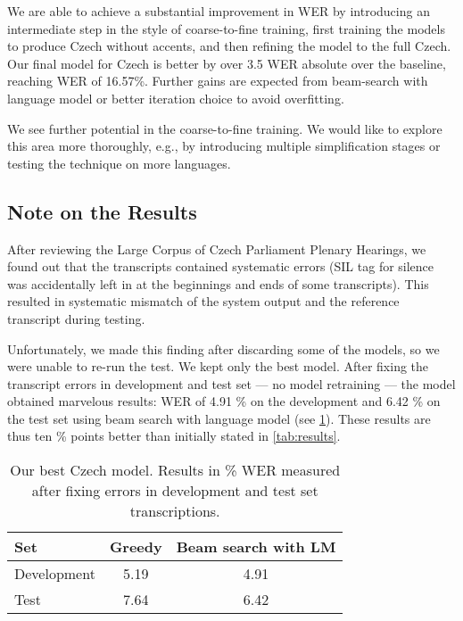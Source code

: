 We are able to achieve a substantial improvement in WER by introducing an intermediate step in the style of coarse-to-fine training, first training the models to produce Czech without accents, and then refining the model to the full Czech.
Our final model for Czech is better by over 3.5 WER absolute over the baseline, reaching WER of 16.57\%. Further gains are expected from beam-search with language model or better iteration choice to avoid overfitting.


We see further potential in the coarse-to-fine training. We would like to explore this area more thoroughly, e.g., by introducing multiple simplification stages or testing the technique on more languages.


\subsection{Note on the Results}
After reviewing the Large Corpus of Czech Parliament Plenary Hearings, we found out that the transcripts contained systematic errors (SIL tag for silence was accidentally left in at the beginnings and ends of some transcripts). This resulted in systematic mismatch of the system output and the reference transcript during testing. 

Unfortunately, we made this finding after discarding some of the models, so we were unable to re-run the test. We kept only the best model. After fixing the transcript errors in development and test set --- no model retraining --- the model obtained marvelous results: WER of 4.91 \% on the development and 6.42 \% on the test set using beam search with language model (see \cref{tab:results_rerun}). These results are thus ten \% points better than initially stated in \cref{tab:results}.

\begin{table}[t]
	\centering
	\begin{tabular}{lcc}
		\bf Set & \bf Greedy & \bf Beam search with LM \\
		\hline
		Development & 5.19 & 4.91 \\
		Test & 7.64 & 6.42 \\
	\end{tabular}
	\caption{Our best Czech model. Results in \% WER measured after fixing errors in development and test set transcriptions.}
	\label{tab:results_rerun}
\end{table}

